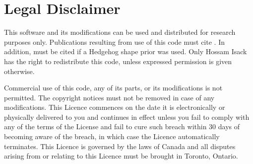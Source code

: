 \documentclass[12pt,letterpaper]{article}
\begin{document}
\restoregeometry %
\nopagecolor%
 


\pagestyle{empty}
\tableofcontents
\newpage
\section{Legal Disclaimer}


This software and its modifications can be used and distributed for
   research purposes only. Publications resulting from use of this code
    must cite \cite{pathmovesIsack}. In addition, \cite{hedgehogIsack} must be cited if a Hedgehog shape prior was used.
    Only Hossam Isack has the right to redistribute this code, unless expressed
    permission is given otherwise.

Commercial use of this code, any of
    its parts, or its modifications is not permitted. The copyright notices
    must not be removed in case of any modifications. This Licence
    commences on the date it is electronically or physically delivered
    to you and continues in effect unless you fail to comply with any of
    the terms of the License and fail to cure such breach within 30 days
    of becoming aware of the breach, in which case the Licence automatically
    terminates. This Licence is governed by the laws of Canada and all
    disputes arising from or relating to this Licence must be brought
    in Toronto, Ontario.
\end{document}
